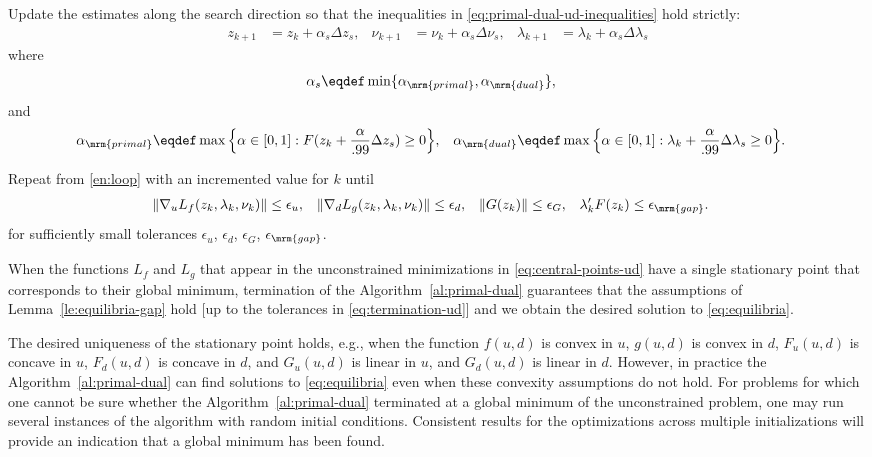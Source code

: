 \documentclass[11pt]{article}
\begin{document}
\begin{algorithm}
\begin{steps}
\item Update the estimates along the search direction so that the
  inequalities in \eqref{eq:primal-dual-ud-inequalities} hold strictly:
  \begin{align*}
    z_{k+1}&=z_k+\alpha_s\Delta z_s, &
    \nu_{k+1}&=\nu_k+\alpha_s \Delta \nu_s, &
    \lambda_{k+1}&=\lambda_k+\alpha_s \Delta \lambda_s
  \end{align*}
  where
  \begin{align*}
    \alpha_s&\eqdef\min\{\alpha_\mrm{primal},\alpha_\mrm{dual}\}, 
  \end{align*}
  and
  \begin{align}
    \alpha_\mrm{primal}&\eqdef \max\Big\{\alpha\in[0,1]:F(z_k+\frac{\alpha}{.99} \Delta z_s)\ge 0\Big\}, &
    \alpha_\mrm{dual}&\eqdef \max\Big\{\alpha\in[0,1]:\lambda_k+\frac{\alpha}{.99} \Delta\lambda_s\ge 0 \Big\}.
  \end{align}

\item Repeat from \ref{en:loop} with an incremented value for $k$ until
  \begin{align}\label{eq:termination-ud}
    \|\nabla_u L_f(z_k,\lambda_k,\nu_k)\|&\le \epsilon_u, &
    \|\nabla_d L_g(z_k,\lambda_k,\nu_k)\|&\le \epsilon_d, &
    \|G(z_k)\|&\le \epsilon_G, &
    \lambda_k 'F(z_k)&\le \epsilon_\mrm{gap}.
  \end{align}
  for sufficiently small tolerances $\epsilon_u$, $\epsilon_d$, $\epsilon_G$,
  $\epsilon_\mrm{gap}$. \frqed
\end{steps}
\end{algorithm}

When the functions $L_f$ and $L_g$ that appear in the unconstrained
minimizations in \eqref{eq:central-points-ud} have a single stationary
point that corresponds to their global minimum, termination of the
Algorithm~\ref{al:primal-dual} guarantees that the assumptions of
Lemma~\ref{le:equilibria-gap} hold [up to the tolerances in
\eqref{eq:termination-ud}] and we obtain the desired solution to
\eqref{eq:equilibria}.

\medskip

The desired uniqueness of the stationary point holds, e.g., when the
function $f(u,d)$ is convex in $u$, $g(u,d)$ is convex in $d$,
$F_u(u,d)$ is concave in $u$, $F_d(u,d)$ is concave in $d$, and
$G_u(u,d)$ is linear in $u$, and $G_d(u,d)$ is linear in $d$. However,
in practice the Algorithm~\ref{al:primal-dual} can find solutions to
\eqref{eq:equilibria} even when these convexity assumptions do not
hold. For problems for which one cannot be sure whether the
Algorithm~\ref{al:primal-dual} terminated at a global minimum of the
unconstrained problem, one may run several instances of the algorithm with
random initial conditions. Consistent results for the optimizations
across multiple initializations will provide an indication that a global
minimum has been found.
\end{document}
